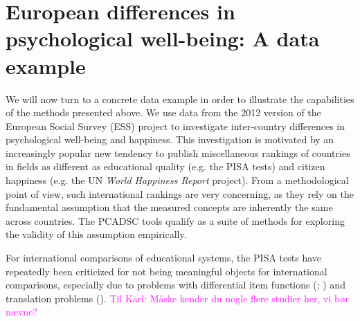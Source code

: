 \documentclass[titlepage,11pt,twoside]{article}
\newcommand{\hl}[1]{\textcolor{magenta}{#1}}
\begin{document}


\section{European differences in psychological well-being: A data example}
\label{sec:dataexample}
We will now turn to a concrete data example in order to illustrate the capabilities of the methods presented above. We use data from the 2012 version of the European Social Survey (ESS) project to investigate inter-country differences in psychological well-being and happiness. This investigation is motivated by an increasingly popular new tendency to publish miscellaneous rankings of countries in fields as different as educational quality (e.g. the PISA tests) and citizen happiness (e.g. the UN \textit{World Happiness Report} project). From a methodological point of view, such international rankings are very concerning, as they rely on the fundamental assumption  that the measured concepts are inherently the same across countries. The PCADSC tools qualify as a suite of methods for exploring the validity of this assumption empirically.

For international comparisons of educational systems, the PISA tests have repeatedly been criticized for not being meaningful objects for international comparisons, especially due to problems with differential item functions (\cite{Kankaras2014}; \cite{Kreiner2014}) and translation problems (\cite{Asil2016}). \hl{Til Karl: Måske kender du nogle flere studier her, vi bør nævne?} 
\end{document}
